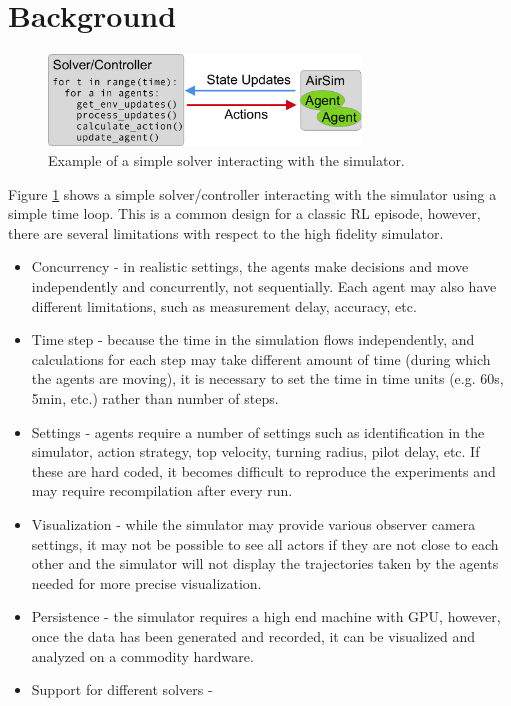 \documentclass{article}
\begin{document}
\section{Background}
\begin{figure}
	\centering
	\includegraphics[width=8.31cm]{naive-solver}
	\caption{Example of a simple solver interacting with the simulator.}\label{fig:naive-solver}
\end{figure}

Figure \ref{fig:naive-solver} shows a simple solver/controller interacting with the simulator using a simple time loop. This is a common design for a classic RL episode, however, there are several limitations with respect to the high fidelity simulator. 
\begin{itemize}
	\item Concurrency - in realistic settings, the agents make decisions and move independently and concurrently, not sequentially. Each agent may also have different limitations, such as measurement delay, accuracy, etc.
	\item Time step - because the time in the simulation flows independently, and calculations for each step may take different amount of time (during which the agents are moving), it is necessary to set the time in time units (e.g. 60s, 5min, etc.) rather than number of steps.
	\item Settings - agents require a number of settings such as identification in the simulator, action strategy, top velocity, turning radius, pilot delay, etc. If these are hard coded, it becomes difficult to reproduce the experiments and may require recompilation after every run.
	\item Visualization - while the simulator may provide various observer camera settings, it may not be possible to see all actors if they are not close to each other and the simulator will not display the trajectories taken by the agents needed for more precise visualization.
	\item Persistence - the simulator requires a high end machine with GPU, however, once the data has been generated and recorded, it can be visualized and analyzed on a commodity hardware.
	\item Support for different solvers - 
\end{itemize}
\end{document}
